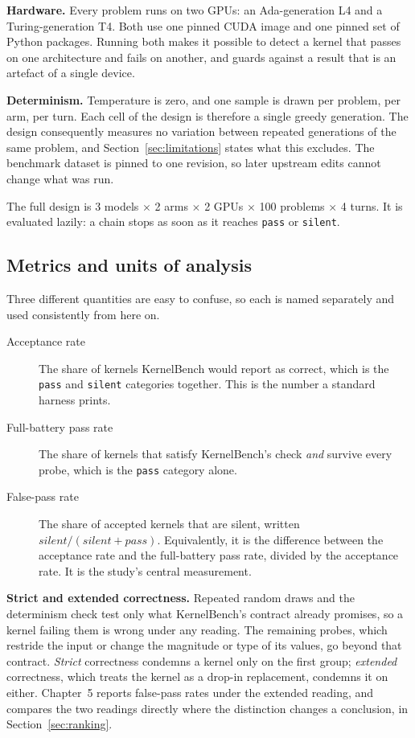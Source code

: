\documentclass[12pt]{article}
\begin{document}
\textbf{Hardware.} Every problem runs on two GPUs: an Ada-generation L4 and a
Turing-generation T4. Both use one pinned CUDA image and one pinned set of
Python packages. Running both makes it possible to detect a kernel that passes
on one architecture and fails on another, and guards against a result that is
an artefact of a single device.

\textbf{Determinism.} Temperature is zero, and one sample is drawn per problem,
per arm, per turn. Each cell of the design is therefore a single greedy
generation. The design consequently measures no variation between repeated
generations of the same problem, and Section~\ref{sec:limitations} states what
this excludes. The benchmark dataset is pinned to one revision, so later upstream edits
cannot change what was run.

The full design is 3 models $\times$ 2 arms $\times$ 2 GPUs $\times$ 100
problems $\times$ 4 turns. It is evaluated lazily: a chain stops as soon as it
reaches \texttt{pass} or \texttt{silent}.

\subsection{Metrics and units of analysis}
\label{sec:metrics}

Three different quantities are easy to confuse, so each is named separately and
used consistently from here on.

\begin{description}
\item[Acceptance rate] The share of kernels KernelBench would report as
correct, which is the \texttt{pass} and \texttt{silent} categories together.
This is the number a standard harness prints.
\item[Full-battery pass rate] The share of kernels that satisfy KernelBench's
check \emph{and} survive every probe, which is the \texttt{pass} category
alone.
\item[False-pass rate] The share of accepted kernels that are silent, written
$\mathit{silent} / (\mathit{silent} + \mathit{pass})$. Equivalently, it is the
difference between the acceptance rate and the full-battery pass rate, divided
by the acceptance rate. It is the study's central measurement.
\end{description}

\textbf{Strict and extended correctness.} Repeated random draws and the
determinism check test only what KernelBench's contract already promises, so a
kernel failing them is wrong under any reading. The remaining probes, which
restride the input or change the magnitude or type of its values, go beyond
that contract. \emph{Strict} correctness condemns a kernel only on the first
group; \emph{extended} correctness, which treats the kernel as a drop-in
replacement, condemns it on either. Chapter~5 reports
false-pass rates under the extended reading, and compares the two readings
directly where the distinction changes a conclusion, in
Section~\ref{sec:ranking}.
\end{document}
